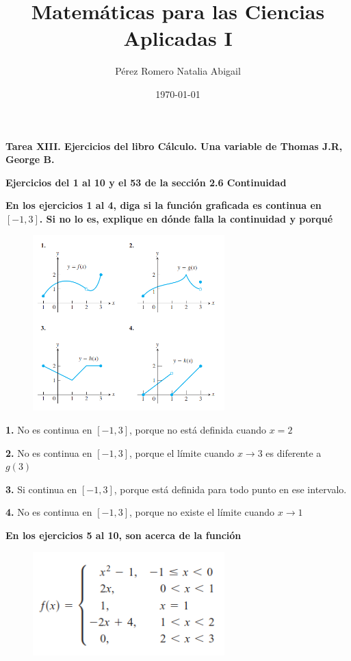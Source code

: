 \documentclass[12pt, letterpaper]{article}
\title{Matemáticas para las Ciencias Aplicadas I}
\author{Pérez Romero Natalia Abigail}
\date{\today}
\begin{document}
\maketitle
\textbf{Tarea XIII. Ejercicios del libro Cálculo. Una variable de Thomas J.R, George B.}

\textbf{Ejercicios del 1 al 10 y el 53 de  la sección 2.6 Continuidad}

\textbf{En los ejercicios 1 al 4, diga si la función graficada es continua en $[-1,3]$. Si no lo es, explique en dónde falla la continuidad y porqué }\\

\begin{figure}[tbh]
\centering
\includegraphics[width=20em]{t13uno}
\end{figure}


\textbf{1.} No es continua en $[-1,3]$, porque no está definida cuando $x=2$

\textbf{2.} No es continua en $[-1,3]$, porque el límite cuando $x \to 3$ es diferente a $g(3)$

\textbf{3.} Si continua en $[-1,3]$, porque está definida para todo punto en ese intervalo.

\textbf{4.} No es continua en $[-1,3]$, porque no existe el límite cuando $x \to 1$


\textbf{En los ejercicios 5 al 10, son acerca de la función}\\

\begin{figure}[tbh]
\centering
\includegraphics[width=20em]{t13dos}
\end{figure}
\end{document}
